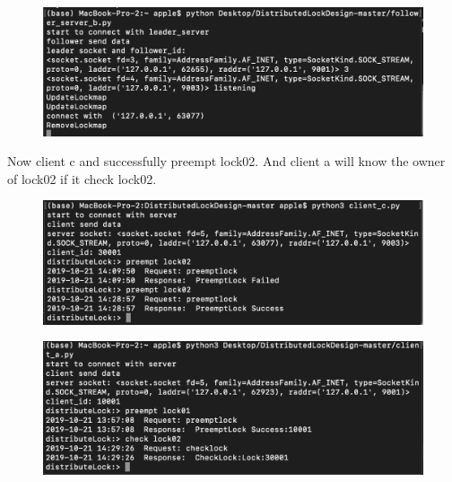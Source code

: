 \documentclass[10pt]{article}
\begin{document}
\begin{figure}[H]
\centerline{\includegraphics[width = 1\textwidth]{screenshot//follower_b_05.png}}
\end{figure}

Now client c and successfully preempt lock02. And client a will know the owner of lock02 if it check lock02.

\begin{figure}[H]
\centerline{\includegraphics[width = 1\textwidth]{screenshot//client_10.png}}
\end{figure}

\begin{figure}[H]
\centerline{\includegraphics[width = 1\textwidth]{screenshot//client_11.png}}
\end{figure}
\end{document}
